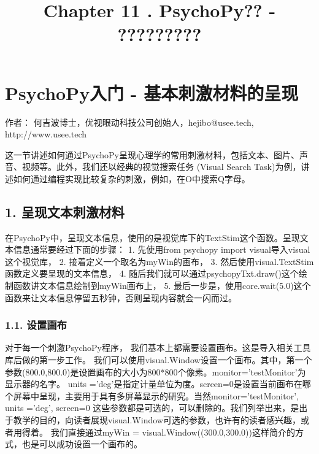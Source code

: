 \documentclass[11pt]{article}
\title{Chapter 11 . PsychoPy?? - ?????????}
\begin{document}
    
    
    \maketitle
    
    

    
    \section{PsychoPy入门 -
基本刺激材料的呈现}\label{psychopyux5165ux95e8---ux57faux672cux523aux6fc0ux6750ux6599ux7684ux5448ux73b0}

    作者： 何吉波博士，优视眼动科技公司创始人，hejibo@usee.tech,
http://www.usee.tech

    这一节讲述如何通过PsychoPy呈现心理学的常用刺激材料，包括文本、图片、声音、视频等。此外，我们还以经典的视觉搜索任务
(Visual Search
Task)为例，讲述如何通过编程实现比较复杂的刺激，例如，在O中搜索Q字母。

    \subsection{1.
呈现文本刺激材料}\label{ux5448ux73b0ux6587ux672cux523aux6fc0ux6750ux6599}

在PsychoPy中，呈现文本信息，使用的是视觉库下的TextStim这个函数。呈现文本信息通常要经过下面的步骤：
1. 先使用from psychopy import visual导入visual这个视觉库， 2.
接着定义一个取名为myWin的画布， 3.
然后使用visual.TextStim函数定义要呈现的文本信息， 4.
随后我们就可以通过psychopyTxt.draw()这个绘制函数讲文本信息绘制到myWin画布上，
5.
最后一步是，使用core.wait(5.0)这个函数来让文本信息停留五秒钟，否则呈现内容就会一闪而过。

\subsubsection{1.1. 设置画布}\label{ux8bbeux7f6eux753bux5e03}

对于每一个刺激PsychoPy程序，
我们基本上都需要设置画布。这是导入相关工具库后做的第一步工作。
我们可以使用visual.Window设置一个画布。其中，第一个参数(800.0,800.0)是设置画布的大小为800*800个像素。monitor='testMonitor'为显示器的名字。
units
='deg'是指定计量单位为度。screen=0是设置当前画布在哪个屏幕中呈现，主要用于具有多屏幕显示的研究。当然monitor='testMonitor',
units ='deg', screen=0
这些参数都是可选的，可以删除的。我们列举出来，是出于教学的目的，向读者展现visual.Window可选的参数，也许有的读者感兴趣，或者用得着。
我们直接通过myWin =
visual.Window((300.0,300.0))这样简介的方式，也是可以成功设置一个画布的。
\end{document}
